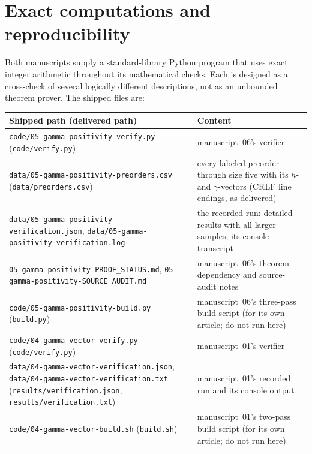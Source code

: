 \documentclass[11pt]{article}
\numberwithin{equation}{section}
\theoremstyle{definition}
\begin{document}
\section{Exact computations and reproducibility}\label{gam:sec:verification}
Both manuscripts supply a standard-library Python program that uses exact
integer arithmetic throughout its mathematical checks. Each is designed as a
cross-check of several logically different descriptions, not as an
unbounded theorem prover. The shipped files are:
\begin{center}
\small
\begin{tabularx}{\textwidth}{@{}>{\raggedright}p{}Y@{}}
\toprule
Shipped path (delivered path) & Content\\
\midrule
\nolinkurl{code/05-gamma-positivity-verify.py} (\nolinkurl{code/verify.py}) &
 manuscript~06's verifier\\
\nolinkurl{data/05-gamma-positivity-preorders.csv} (\nolinkurl{data/preorders.csv}) &
 every labeled preorder through size five with its $h$- and $\gamma$-vectors
 (CRLF line endings, as delivered)\\
\nolinkurl{data/05-gamma-positivity-verification.json},
\nolinkurl{data/05-gamma-positivity-verification.log} &
 the recorded run: detailed results with all larger samples; its console
 transcript\\
\nolinkurl{05-gamma-positivity-PROOF_STATUS.md},
\nolinkurl{05-gamma-positivity-SOURCE_AUDIT.md} &
 manuscript~06's theorem-dependency and source-audit notes\\
\nolinkurl{code/05-gamma-positivity-build.py} (\nolinkurl{build.py}) &
 manuscript~06's three-pass build script (for its own article; do not run here)\\
\nolinkurl{code/04-gamma-vector-verify.py} (\nolinkurl{code/verify.py}) &
 manuscript~01's verifier\\
\nolinkurl{data/04-gamma-vector-verification.json},
\nolinkurl{data/04-gamma-vector-verification.txt}
(\nolinkurl{results/verification.json}, \nolinkurl{results/verification.txt}) &
 manuscript~01's recorded run and its console output\\
\nolinkurl{code/04-gamma-vector-build.sh} (\nolinkurl{build.sh}) &
 manuscript~01's two-pass build script (for its own article; do not run here)\\
\bottomrule
\end{tabularx}
\end{center}
\end{document}
